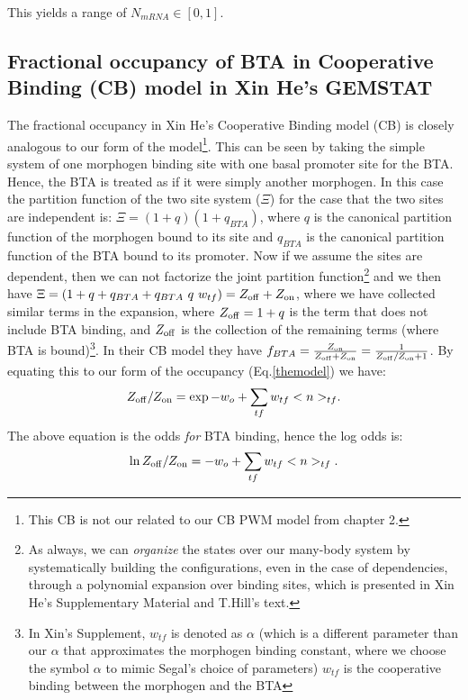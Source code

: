 This yields a range of $N_{mRNA} \in [0,1]$.

\subsection{Fractional occupancy of BTA in Cooperative Binding (CB) model in Xin He's GEMSTAT}

The fractional occupancy in Xin He's Cooperative Binding model (CB) is closely analogous to our form of the model\footnote{This CB is not our related to our CB PWM model from chapter 2.}.  This can be seen by taking the simple system of one morphogen binding site with one basal promoter site for the BTA.  Hence, the BTA is treated as if it were simply another morphogen.  In this case the partition function of the two site system ($\Xi$) for the case that the two sites are independent is: $\Xi=(1+q)(1+q_{BTA})$, where $q$ is the canonical partition function of the morphogen bound to its site and $q_{BTA}$ is the canonical partition function of the BTA bound to its promoter.  Now if we assume the sites are dependent, then we can not factorize the joint partition function\footnote{As always, we can \emph{organize} the states over our many-body system by systematically building the configurations, even in the case of dependencies, through a polynomial expansion over binding sites, which is presented in Xin He's Supplementary Material and T.Hill's text\cite{hill}.} and we then have $\Xi=(1+q+ q_{BTA} +q_{BTA} \ q \ w_{tf}) = Z_{\rm{off}} + Z_{\rm{on}}$, where we have collected similar terms in the expansion, where $Z_{\rm{off}}=1+q$ is the term that does not include BTA binding, and $Z_{\rm{off}}$ is the collection of the remaining terms (where BTA is bound)\footnote{In Xin's Supplement, $w_{tf}$ is denoted as $\alpha$ (which is a different parameter than our $\alpha$ that approximates the morphogen binding constant, where we choose the symbol $\alpha$ to mimic Segal's choice of parameters) $w_{tf}$ is the cooperative binding between the morphogen and the BTA}.  In their CB model they have $f_{BTA}=\frac{Z_{\rm{on}}}{Z_{\rm{off}}+Z_{\rm{on}}}=\frac{1}{Z_{\rm{off}}/Z_{\rm{on}}+1}$.  By equating this to our form of the occupancy (Eq.\ref{themodel}) we have:
\begin{equation}
Z_{\rm{off}}/Z_{\rm{on}} = \exp{-w_o + \sum_{tf} w_{tf} < n >_{tf} }.
\end{equation}
The above equation is the odds \emph{for} BTA binding, hence the log odds is:
\begin{equation}
\ln{Z_{\rm{off}}/Z_{\rm{on}}} = -w_o + \sum_{tf} w_{tf} < n >_{tf} .
\end{equation}
